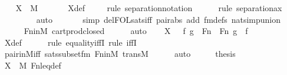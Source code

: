 \begin{isabellebody}
\ \ \isamarkupfalse%
\ {\isachardoublequoteopen}X\ {\isasymin}\ M{\isachardoublequoteclose}\ \isanewline
\ \ \ \ \isamarkupfalse%
\ X{\isacharunderscore}{\kern0pt}def\isanewline
\ \ \ \ \isamarkupfalse%
{\isacharparenleft}{\kern0pt}rule\ separation{\isacharunderscore}{\kern0pt}notation{\isacharparenright}{\kern0pt}\isanewline
\ \ \ \ \ \isamarkupfalse%
{\isacharparenleft}{\kern0pt}rule\ separation{\isacharunderscore}{\kern0pt}ax{\isacharparenright}{\kern0pt}\isanewline
\ \ \ \ \ \ \ \isamarkupfalse%
\ auto{\isacharbrackleft}{\kern0pt}{}{\isacharbrackright}{\kern0pt}\isanewline
\ \ \ \ \ \isamarkupfalse%
\ {\isacharparenleft}{\kern0pt}simp\ del{\isacharcolon}{\kern0pt}FOL{\isacharunderscore}{\kern0pt}sats{\isacharunderscore}{\kern0pt}iff\ pair{\isacharunderscore}{\kern0pt}abs\ add{\isacharcolon}{\kern0pt}\ fm{\isacharunderscore}{\kern0pt}defs\ nat{\isacharunderscore}{\kern0pt}simp{\isacharunderscore}{\kern0pt}union{\isacharparenright}{\kern0pt}\isanewline
\ \ \ \ \isamarkupfalse%
\ Fn{\isacharunderscore}{\kern0pt}in{\isacharunderscore}{\kern0pt}M\ cartprod{\isacharunderscore}{\kern0pt}closed\isanewline
\ \ \ \ \isamarkupfalse%
\ auto\isanewline
\ \ \isamarkupfalse%
\ {\isachardoublequoteopen}X\ {\isacharequal}{\kern0pt}\ {\isacharbraceleft}{\kern0pt}\ {\isacharless}{\kern0pt}f{\isacharcomma}{\kern0pt}\ g{\isachargreater}{\kern0pt}\ {\isasymin}\ Fn\ {\isasymtimes}\ Fn{\isachardot}{\kern0pt}\ g\ {\isasymsubseteq}\ f\ {\isacharbraceright}{\kern0pt}{\isachardoublequoteclose}\ \isanewline
\ \ \ \ \isamarkupfalse%
\ X{\isacharunderscore}{\kern0pt}def\ \isanewline
\ \ \ \ \isamarkupfalse%
{\isacharparenleft}{\kern0pt}rule\ equality{\isacharunderscore}{\kern0pt}iffI{\isacharcomma}{\kern0pt}\ rule\ iffI{\isacharparenright}{\kern0pt}\isanewline
\ \ \ \ \isamarkupfalse%
\ pair{\isacharunderscore}{\kern0pt}in{\isacharunderscore}{\kern0pt}M{\isacharunderscore}{\kern0pt}iff\ sats{\isacharunderscore}{\kern0pt}subset{\isacharunderscore}{\kern0pt}fm{\isacharprime}{\kern0pt}\ Fn{\isacharunderscore}{\kern0pt}in{\isacharunderscore}{\kern0pt}M\ transM\isanewline
\ \ \ \ \isamarkupfalse%
\ auto\isanewline
\ \ \isamarkupfalse%
\ \isamarkupfalse%
\ {\isacharquery}{\kern0pt}thesis\ \isamarkupfalse%
\ {\isacartoucheopen}X\ {\isasymin}\ M{\isacartoucheclose}\ Fn{\isacharunderscore}{\kern0pt}leq{\isacharunderscore}{\kern0pt}def\ \isamarkupfalse%

\end{isabellebody}
